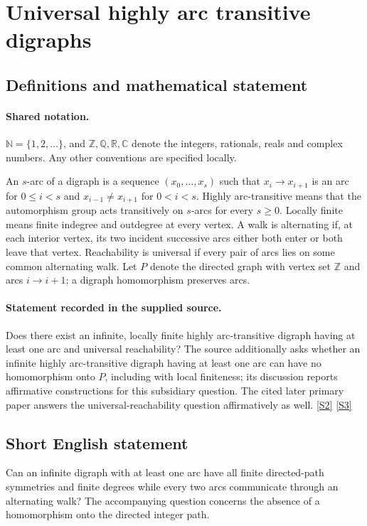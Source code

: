 \documentclass[11pt]{article}
\newcommand{\sref}[2]{\hyperlink{source:#1:#2}{[S#2]}}
\begin{document}
\section{Universal highly arc transitive digraphs}\label{statement}

\subsection{Definitions and mathematical statement}

\paragraph{Shared notation.}$\mathbb N=\{1,2,\ldots\}$, and $\mathbb Z,\mathbb Q,\mathbb R,\mathbb C$ denote the integers, rationals, reals and complex numbers. Any other conventions are specified locally.


An $s$-arc of a digraph is a sequence $(x_0,\ldots,x_s)$ such that $x_i\to x_{i+1}$ is an arc for $0\leq i<s$ and $x_{i-1}\ne x_{i+1}$ for $0<i<s$. Highly arc-transitive means that the automorphism group acts transitively on $s$-arcs for every $s\geq0$. Locally finite means finite indegree and outdegree at every vertex. A walk is alternating if, at each interior vertex, its two incident successive arcs either both enter or both leave that vertex. Reachability is universal if every pair of arcs lies on some common alternating walk. Let $P$ denote the directed graph with vertex set $\mathbb Z$ and arcs $i\to i+1$; a digraph homomorphism preserves arcs.
\paragraph{Statement recorded in the supplied source.}
Does there exist an infinite, locally finite highly arc-transitive digraph having at least one arc and universal reachability? The source additionally asks whether an infinite highly arc-transitive digraph having at least one arc can have no homomorphism onto $P$, including with local finiteness; its discussion reports affirmative constructions for this subsidiary question. The cited later primary paper answers the universal-reachability question affirmatively as well. \sref{statement}{2} \sref{statement}{3}
\subsection{Short English statement}
Can an infinite digraph with at least one arc have all finite directed-path symmetries and finite degrees while every two arcs communicate through an alternating walk? The accompanying question concerns the absence of a homomorphism onto the directed integer path.
\end{document}

